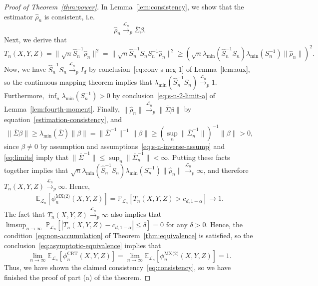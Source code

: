\documentclass[12pt]{article}
\theoremstyle{definition}
\theoremstyle{remark}
\newcommand{\srx}{X}
\newcommand{\srz}{Z}
\newcommand{\sry}{Y}
\begin{document}
\begin{proof}[Proof of Theorem~\ref{thm:power}]
	
In Lemma~\ref{lem:consistency}, we show that the estimator $\widehat \rho_n$ is consistent, i.e. 
\begin{equation}
\widehat \rho_n \overset{\mathcal L_n}\rightarrow_p \overline\Sigma \beta. 
\label{estimation-consistency}
\end{equation}
Next, we derive that
\begin{equation*}
T_n(\srx, \sry, \srz) = \|\sqrt n\widehat S_n^{-1}\widehat \rho_n\|^2 = \|\sqrt n\widehat S_n^{-1}S_n S_n^{-1}\widehat \rho_n\|^2 \geq \left(\sqrt{n}\lambda_{\min}(\widehat S_n^{-1}S_n)\lambda_{\min}(S_n^{-1}) \|\widehat \rho_n\|\right)^2.
\end{equation*}
Now, we have $\widehat S_n^{-1}S_n \overset{\mathcal L_n}\rightarrow _p  I_d$ by conclusion~\eqref{eq:conv-s-neg-1} of Lemma~\ref{lem:aux}, so the continuous mapping theorem implies that $\lambda_{\min}(\widehat S_n^{-1}S_n) \overset{\mathcal L_n}\rightarrow _p 1$. Furthermore, $\inf_n \lambda_{\min}(S_n^{-1}) > 0$ by conclusion~\eqref{eq:s-n-2-limit-a} of Lemma~\ref{lem:fourth-moment}. Finally, $\|\widehat \rho_n\| \overset{\mathcal L_n}\rightarrow _p \|\overline \Sigma \beta\|$ by equation~\eqref{estimation-consistency}, and 
\[
\|\overline \Sigma \beta\| \geq \lambda_{\min}(\overline \Sigma)\|\beta\| = \|\overline \Sigma^{-1}\|^{-1}\|\beta\| \geq \left(\sup_n \|\overline \Sigma_n^{-1}\|\right)^{-1}\|\beta\| > 0,
\]
since $\beta \neq 0$ by assumption and assumptions~\eqref{eq:s-n-inverse-assump} and \eqref{eq:limits} imply that $\|\overline \Sigma^{-1}\| \leq \sup_n \|\overline \Sigma_n^{-1}\| < \infty$. Putting these facts together implies that $\sqrt{n}\lambda_{\min}(\widehat S_n^{-1}S_n)\lambda_{\min}(S_n^{-1}) \|\widehat \rho_n\|\overset{\mathcal L_n}\rightarrow _p \infty$, and therefore $T_n(\srx, \sry, \srz) \overset{\mathcal L_n}\rightarrow _p \infty$. Hence,
\begin{equation}
\begin{split}
\mathbb E_{\mathcal L_n}[\phi_n^{\text{MX(2)}}(\srx, \sry, \srz)] = \mathbb P_{\mathcal L_n}[T_n(\srx, \sry, \srz) > c_{d,1-\alpha}] \rightarrow 1.
\end{split}
\end{equation}
The fact that $T_n(\srx, \sry, \srz) \overset{\mathcal L_n}\rightarrow _p \infty$ also implies that $\limsup_{n \rightarrow \infty}\ \mathbb P_{\mathcal L_n}[|T_n(\srx, \sry, \srz)-c_{d,1-\alpha}| \leq \delta] = 0$ for any $\delta > 0$. Hence, the condition~\eqref{eq:non-accumulation} of Theorem~\ref{thm:equivalence} is satisfied, so the conclusion~\eqref{eq:asymptotic-equivalence} implies that
\begin{equation*}
\lim_{n \rightarrow \infty}\mathbb E_{\mathcal L_n}[\phi_n^{\text{CRT}}(\srx, \sry, \srz)] = \lim_{n \rightarrow \infty}\mathbb E_{\mathcal L_n}[\phi_n^{\text{MX(2)}}(\srx, \sry, \srz)] = 1.
\end{equation*} 
Thus, we have shown the claimed consistency~\eqref{eq:consistency}, so we have finished the proof of part (a) of the theorem.
	

\end{proof}
\end{document}
